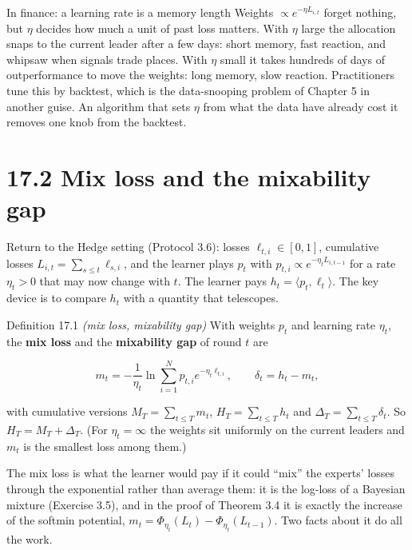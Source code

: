 \documentclass[11pt,a4paper,openany]{book}
\newcommand{\ip}[2]{\langle #1,#2\rangle}
\begin{document}
\begin{bfin}{In finance: a learning rate is a memory length}
Weights $\propto e^{-\eta L_{i,t}}$ forget nothing, but $\eta$ decides how much a unit of past loss matters. With $\eta$ large the allocation snaps to the current leader after a few days: short memory, fast reaction, and whipsaw when signals trade places. With $\eta$ small it takes hundreds of days of outperformance to move the weights: long memory, slow reaction. Practitioners tune this by backtest, which is the data-snooping problem of Chapter 5 in another guise. An algorithm that sets $\eta$ from what the data have already cost it removes one knob from the backtest.
\end{bfin}

\section*{17.2 Mix loss and the mixability gap}\label{ch17-mix}

Return to the Hedge setting (Protocol 3.6): losses $\ell_{t,i}\in[0,1]$, cumulative losses $L_{i,t}=\sum_{s\le t}\ell_{s,i}$, and the learner plays $p_t$ with $p_{t,i}\propto e^{-\eta_tL_{i,t-1}}$ for a rate $\eta_t>0$ that may now change with $t$. The learner pays $h_t=\ip{p_t}{\ell_t}$. The key device is to compare $h_t$ with a quantity that telescopes.

\begin{bdef}{Definition 17.1 \emph{(mix loss, mixability gap)}}
With weights $p_t$ and learning rate $\eta_t$, the \textbf{mix loss} and the \textbf{mixability gap} of round $t$ are

\[m_t=-\frac1{\eta_t}\ln\sum_{i=1}^Np_{t,i}e^{-\eta_t\ell_{t,i}},\qquad \delta_t=h_t-m_t,\]

with cumulative versions $M_T=\sum_{t\le T}m_t$, $H_T=\sum_{t\le T}h_t$ and $\Delta_T=\sum_{t\le T}\delta_t$. So $H_T=M_T+\Delta_T$. (For $\eta_t=\infty$ the weights sit uniformly on the current leaders and $m_t$ is the smallest loss among them.)
\end{bdef}

The mix loss is what the learner would pay if it could ``mix'' the experts' losses through the exponential rather than average them: it is the log-loss of a Bayesian mixture (Exercise 3.5), and in the proof of Theorem 3.4 it is exactly the increase of the softmin potential, $m_t=\Phi_{\eta_t}(L_t)-\Phi_{\eta_t}(L_{t-1})$. Two facts about it do all the work.
\end{document}
